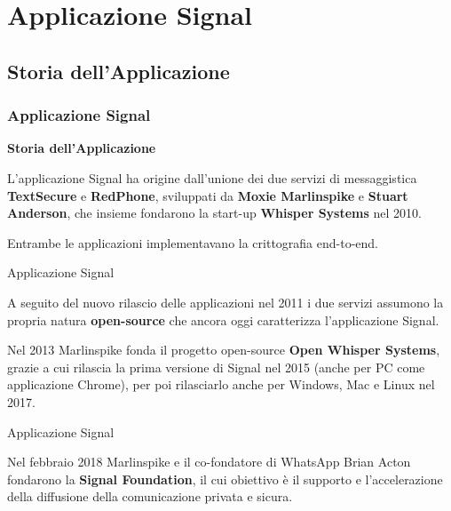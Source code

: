 \section{Applicazione Signal}

\subsection{Storia dell'Applicazione}
\begin{frame}
    \frametitle{Applicazione Signal}
    \textbf{Storia dell'Applicazione}
    \newline
    
    L’applicazione Signal ha origine dall’unione dei due servizi di messaggistica \textbf{TextSecure} e \textbf{RedPhone}, sviluppati da \textbf{Moxie Marlinspike} e \textbf{Stuart Anderson}, che insieme fondarono la start-up \textbf{Whisper Systems} nel 2010.\newline

    Entrambe le applicazioni implementavano la crittografia end-to-end.

\end{frame}

\begin{frame}{Applicazione Signal}

    A seguito del nuovo rilascio delle applicazioni nel 2011 i due servizi assumono la propria natura \textbf{open-source} che ancora oggi caratterizza l’applicazione Signal.\newline
    
    Nel 2013 Marlinspike fonda il progetto open-source \textbf{Open Whisper Systems}, grazie a cui rilascia la prima versione di Signal nel 2015 (anche per PC come applicazione Chrome), per poi rilasciarlo anche per Windows, Mac e Linux nel 2017. \newline
    
\end{frame}

\begin{frame}{Applicazione Signal}

  Nel febbraio 2018 Marlinspike e il co-fondatore di WhatsApp Brian Acton fondarono la \textbf{Signal Foundation}, il cui obiettivo è il supporto e l’accelerazione della diffusione della comunicazione privata e sicura.
    
\end{frame}

